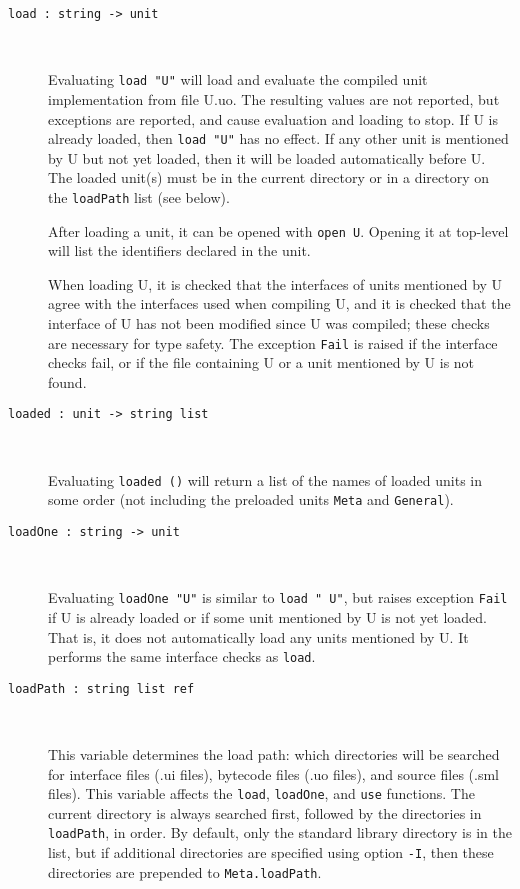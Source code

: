 \documentclass[fleqn,a4paper]{article}
\begin{document}
\begin{description}
\item[{\tt load :\ string -> unit}]\mbox{ }
  
  Evaluating {\tt load "{\rm U}"} will load and evaluate the compiled
  unit implementation from file U.uo.  The resulting values are not
  reported, but exceptions are reported, and cause evaluation and
  loading to stop.  If U is already loaded, then {\tt load "{\rm U}"}
  has no effect.  If any other unit is mentioned by U but not yet
  loaded, then it will be loaded automatically before U.  The loaded
  unit(s) must be in the current directory or in a directory on the
  {\tt loadPath} list (see below).

  After loading a unit, it can be opened with {\tt open U}.  Opening
  it at top-level will list the identifiers declared in the unit.
  
  When loading U, it is checked that the interfaces of units mentioned
  by U agree with the interfaces used when compiling U, and it is
  checked that the interface of U has not been modified since U was
  compiled; these checks are necessary for type safety.  The exception
  {\tt Fail} is raised if the interface checks fail, or if the file
  containing U or a unit mentioned by U is not found.

\item[{\tt loaded :\ unit -> string list}]\mbox{ }
  
  Evaluating {\tt loaded ()} will return a list of the names of loaded
  units in some order (not including the preloaded units {\tt Meta}
  and {\tt General}).

\item[{\tt loadOne :\ string -> unit}]\mbox{ }

  Evaluating {\tt loadOne "{\rm U}"} is similar to {\tt load "{\rm
      U}"}, but raises exception {\tt Fail} if U is already loaded or
  if some unit mentioned by U is not yet loaded.  That is, it does not
  automatically load any units mentioned by U.  It performs the same
  interface checks as {\tt load}.

\item[{\tt loadPath :\ string list ref}]\mbox{ }

  This variable determines the load path: which directories will be
  searched for interface files (.ui files), bytecode files (.uo
  files), and source files (.sml files).  This variable affects the
  {\tt load}, {\tt loadOne}, and {\tt use} functions.  The current
  directory is always searched first, followed by the directories in
  {\tt loadPath}, in order.  By default, only the standard library
  directory is in the list, but if additional directories are
  specified using option {\tt -I}, then these directories are
  prepended to {\tt Meta.loadPath}.


\end{description}
\end{document}

